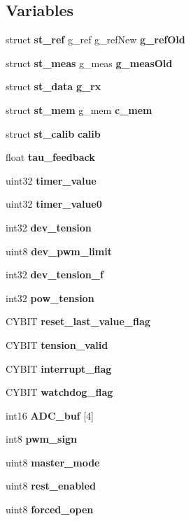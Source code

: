 \subsection*{Variables}
\begin{DoxyCompactItemize}
\item 
struct \textbf{ st\+\_\+ref} g\+\_\+ref g\+\_\+ref\+New \textbf{ g\+\_\+ref\+Old}
\item 
struct \textbf{ st\+\_\+meas} g\+\_\+meas \textbf{ g\+\_\+meas\+Old}
\item 
struct \textbf{ st\+\_\+data} \textbf{ g\+\_\+rx}
\item 
struct \textbf{ st\+\_\+mem} g\+\_\+mem \textbf{ c\+\_\+mem}
\item 
\mbox{\label{globals_8c_aed96fdd8308fe2c4fc07c3b5db1c7bbb}} 
struct \textbf{ st\+\_\+calib} {\bfseries calib}
\item 
float \textbf{ tau\+\_\+feedback}
\item 
uint32 \textbf{ timer\+\_\+value}
\item 
uint32 \textbf{ timer\+\_\+value0}
\item 
int32 \textbf{ dev\+\_\+tension}
\item 
uint8 \textbf{ dev\+\_\+pwm\+\_\+limit}
\item 
int32 \textbf{ dev\+\_\+tension\+\_\+f}
\item 
\mbox{\label{globals_8c_a63d713ff9ac5ba0651f6af9115a32e4d}} 
int32 {\bfseries pow\+\_\+tension}
\item 
C\+Y\+B\+IT \textbf{ reset\+\_\+last\+\_\+value\+\_\+flag}
\item 
C\+Y\+B\+IT \textbf{ tension\+\_\+valid}
\item 
C\+Y\+B\+IT \textbf{ interrupt\+\_\+flag}
\item 
C\+Y\+B\+IT \textbf{ watchdog\+\_\+flag}
\item 
\mbox{\label{globals_8c_abb22f0a4462a0b4db27496654f2175a0}} 
int16 {\bfseries A\+D\+C\+\_\+buf} [4]
\item 
int8 \textbf{ pwm\+\_\+sign}
\item 
\mbox{\label{globals_8c_acf0e2a5d5954714103e295ac35513215}} 
uint8 {\bfseries master\+\_\+mode}
\item 
\mbox{\label{globals_8c_a1f8839fadee52a47a0042eaa695c3f3a}} 
uint8 {\bfseries rest\+\_\+enabled}
\item 
\mbox{\label{globals_8c_a0f13b80a0c329fa3176eb1e72ef36fb8}} 
uint8 {\bfseries forced\+\_\+open}
\item 
\mbox{\label{globals_8c_a485e5b90bbfb79aa97f874873cd6c93a}} 

\end{DoxyCompactItemize}
